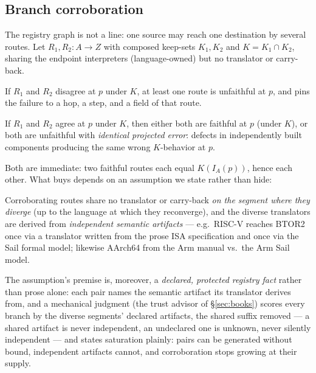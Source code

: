 \subsection{Branch corroboration}
\label{sec:branching}

The registry graph is not a line: one source may reach one destination by
several routes. Let $R_1, R_2 : A \to Z$ with composed keep-sets
$K_1, K_2$ and $K = K_1 \cap K_2$, sharing the endpoint interpreters
(language-owned) but no translator or carry-back.

\begin{lemma}
\label{lem:disagree}
If $R_1$ and $R_2$ disagree at $p$ under $K$, at least one route is
unfaithful at $p$, and  pins the failure to a hop,
a step, and a field of that route.
\end{lemma}

\begin{lemma}
\label{lem:agree}
If $R_1$ and $R_2$ agree at $p$ under $K$, then either both are faithful
at $p$ (under $K$), or both are unfaithful with \emph{identical projected
error}: defects in independently built components producing the same
wrong $K$-behavior at $p$.
\end{lemma}

Both are immediate: two faithful routes each equal $K(I_A(p))$, hence
each other. What  buys depends on an assumption we state
rather than hide:

\begin{assumption}[Diversity]
\label{asm:diversity}
Corroborating routes share no translator or carry-back \emph{on the
segment where they diverge} (up to the language at which they
reconverge), and the diverse translators are derived from
\emph{independent semantic artifacts} --- e.g.\ RISC-V reaches BTOR2
once via a translator written from the prose ISA specification and once
via the Sail formal model; likewise AArch64 from the Arm manual vs.\ the
Arm Sail model.
\end{assumption}

The assumption's premise is, moreover, a \emph{declared,
protected registry fact} rather than prose alone: each pair names the
semantic artifact its translator derives from, and a mechanical
judgment (the trust advisor of \S\ref{sec:books}) scores every branch
by the diverse segments' declared artifacts, the shared suffix
removed --- a shared artifact is never independent, an undeclared one
is unknown, never silently independent --- and states saturation
plainly: pairs can be generated without bound, independent artifacts
cannot, and corroboration stops growing at their supply.

